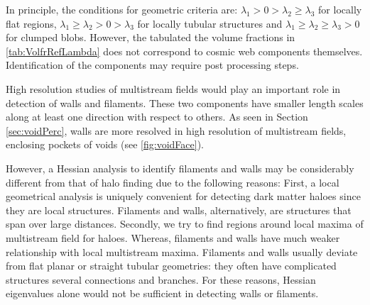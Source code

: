 \documentclass[fleqn,usenatbib,useAMS]{mnras}
\begin{document}
In principle, the conditions for geometric criteria are: $\lambda_1 > 0 > \lambda_2 \geq \lambda_3$ for locally flat regions, $\lambda_1 \geq \lambda_2 > 0 > \lambda_3 $ for locally tubular structures and $\lambda_1 \geq \lambda_2 \geq \lambda_3 > 0$ for clumped blobs. However, the tabulated the volume fractions in \autoref{tab:VolfrRefLambda} does not correspond to cosmic web components themselves. Identification of the components may require post processing steps. 

High resolution studies of multistream fields would play an important role in detection of walls and filaments. These two components have smaller length scales along at least one direction with respect to others. As seen in Section \ref{sec:voidPerc}, walls are more resolved in high resolution of multistream fields, enclosing pockets of voids (see \autoref{fig:voidFace}).  

However, a Hessian analysis to identify filaments and walls may be considerably different from that of halo finding due to the following reasons: First, a local geometrical analysis is uniquely convenient for detecting dark matter haloes since they are local structures. Filaments and walls, alternatively, are structures that span over large distances. Secondly, we try to find regions around local maxima of multistream field for haloes. Whereas, filaments and walls have much weaker relationship with local multistream maxima. Filaments and walls usually deviate from flat planar or straight tubular geometries: they often have complicated structures several connections and branches. For these reasons, Hessian eigenvalues alone would not be sufficient in detecting walls or filaments. 

\end{document}
